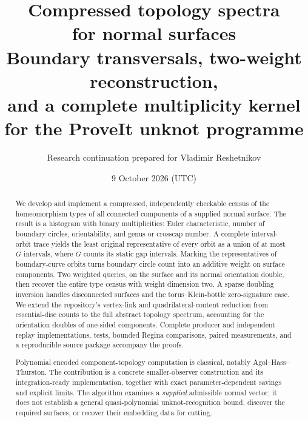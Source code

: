 \documentclass[11pt]{article}
\title{\textbf{Compressed topology spectra\\for normal surfaces}\\[0.7em]
 \large Boundary transversals, two-weight reconstruction,\\
 and a complete multiplicity kernel for the ProveIt unknot programme}
\author{Research continuation prepared for Vladimir Reshetnikov}
\date{9 October 2026 (UTC)}
\theoremstyle{definition}
\begin{document}
\maketitle
\begin{abstract}
We develop and implement a compressed, independently checkable census of the
homeomorphism types of all connected components of a supplied normal surface.
The result is a histogram with binary multiplicities: Euler characteristic,
number of boundary circles, orientability, and genus or crosscap number. A
complete interval-orbit trace yields the least original representative of every
orbit as a union of at most $G$ intervals, where $G$ counts its static gap
intervals. Marking the representatives of boundary-curve orbits turns boundary
circle count into an additive weight on surface components. Two weighted
queries, on the surface and its normal orientation double, then recover the
entire type census with weight dimension two. A sparse doubling inversion
handles disconnected surfaces and the torus--Klein-bottle zero-signature case.
We extend the repository's vertex-link and quadrilateral-content reduction
from essential-disc counts to the full abstract topology spectrum, accounting
for the orientation doubles of one-sided components. Complete producer and
independent replay implementations, tests, bounded Regina comparisons, paired
measurements, and a reproducible source package accompany the proofs.

Polynomial encoded component-topology computation is classical, notably
Agol--Hass--Thurston. The contribution is a concrete smaller-observer
construction and its integration-ready implementation, together with exact
parameter-dependent savings and explicit limits. The algorithm examines a
\emph{supplied} admissible normal vector; it does not establish a general
quasi-polynomial unknot-recognition bound, discover the required surfaces, or
recover their embedding data for cutting.
\end{abstract}
\newpage
\setcounter{tocdepth}{1}
\tableofcontents
\newpage








\end{document}
